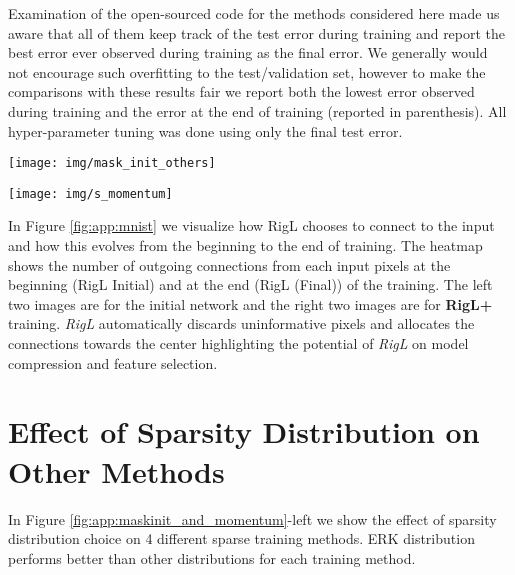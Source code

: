 \documentclass{article}
\begin{document}
Examination of the open-sourced code for the methods considered here made us aware that all of them keep track of the test error during training and report the best error ever observed during training as the final error. We generally would not encourage such overfitting to the test/validation set, however to make the comparisons with these results fair we report both the lowest error observed during training and the error at the end of training (reported in parenthesis).  All hyper-parameter tuning was done using only the final test error.

\begin{figure*}
\centering
\begin{minipage}{.5\textwidth}
  \centering
  \texttt{[image: img/mask\_init\_others]}
\end{minipage}\begin{minipage}{.5\textwidth}
  \centering
  \texttt{[image: img/s\_momentum]}
\end{minipage}
\caption{\textbf{(left)} Effect of sparsity distribution choice on sparse training methods at different sparsity levels. We average over 3 runs and report the standard deviations for each. \textbf{(right)} Effect of momentum value on the performance of SNFS algorithm. Momentum does not become helpful until it reaches extremely large values.}
\label{fig:app:maskinit_and_momentum}
\end{figure*}

In Figure \ref{fig:app:mnist} we visualize how RigL chooses to connect to the input and how this evolves from the beginning to the end of training.  The heatmap shows the number of outgoing connections from each input pixels at the beginning (RigL Initial) and at the end (RigL (Final)) of the training. The left two images are for the initial network and the right two images are for \textbf{RigL+} training.  \textit{RigL} automatically discards uninformative pixels and allocates the connections towards the center highlighting the potential of \textit{RigL} on model compression and feature selection.


\section{Effect of Sparsity Distribution on Other Methods}
\label{app:initmethods}
In Figure \ref{fig:app:maskinit_and_momentum}-left we show the effect of sparsity distribution choice on 4 different sparse training methods. ERK distribution performs better than other distributions for each training method.
\end{document}
